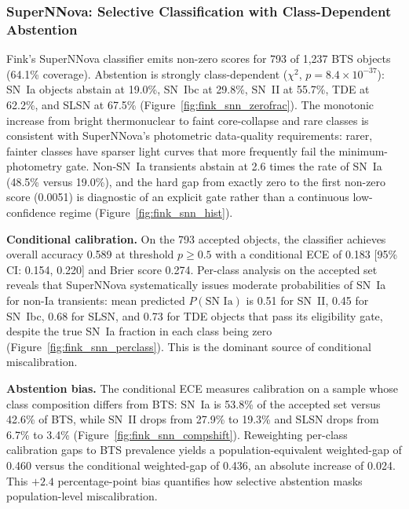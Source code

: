 \documentclass[twocolumn]{aastex631}
\begin{document}
\subsubsection{SuperNNova: Selective Classification with Class-Dependent Abstention} \label{sec:fink_snn}

Fink's SuperNNova classifier \citep{moller2020} emits non-zero scores for 793 of 1,237 BTS objects (64.1\% coverage). Abstention is strongly class-dependent ($\chi^2$, $p = 8.4 \times 10^{-37}$): SN~Ia objects abstain at 19.0\%, SN~Ibc at 29.8\%, SN~II at 55.7\%, TDE at 62.2\%, and SLSN at 67.5\% (Figure~\ref{fig:fink_snn_zerofrac}). The monotonic increase from bright thermonuclear to faint core-collapse and rare classes is consistent with SuperNNova's photometric data-quality requirements: rarer, fainter classes have sparser light curves that more frequently fail the minimum-photometry gate. Non-SN~Ia transients abstain at 2.6 times the rate of SN~Ia (48.5\% versus 19.0\%), and the hard gap from exactly zero to the first non-zero score (0.0051) is diagnostic of an explicit gate rather than a continuous low-confidence regime (Figure~\ref{fig:fink_snn_hist}).

\textbf{Conditional calibration.} On the 793 accepted objects, the classifier achieves overall accuracy 0.589 at threshold $p \ge 0.5$ with a conditional ECE of 0.183 [95\% CI: 0.154, 0.220] and Brier score 0.274. Per-class analysis on the accepted set reveals that SuperNNova systematically issues moderate probabilities of SN~Ia for non-Ia transients: mean predicted $P(\text{SN~Ia})$ is 0.51 for SN~II, 0.45 for SN~Ibc, 0.68 for SLSN, and 0.73 for TDE objects that pass its eligibility gate, despite the true SN~Ia fraction in each class being zero (Figure~\ref{fig:fink_snn_perclass}). This is the dominant source of conditional miscalibration.

\textbf{Abstention bias.} The conditional ECE measures calibration on a sample whose class composition differs from BTS: SN~Ia is 53.8\% of the accepted set versus 42.6\% of BTS, while SN~II drops from 27.9\% to 19.3\% and SLSN drops from 6.7\% to 3.4\% (Figure~\ref{fig:fink_snn_compshift}). Reweighting per-class calibration gaps to BTS prevalence yields a population-equivalent weighted-gap of 0.460 versus the conditional weighted-gap of 0.436, an absolute increase of 0.024. This $+2.4$ percentage-point bias quantifies how selective abstention masks population-level miscalibration.
\end{document}
